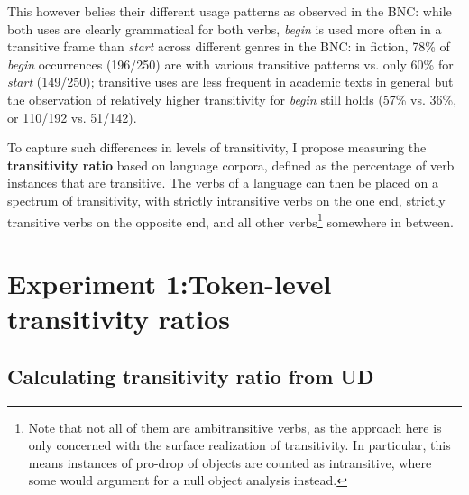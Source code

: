 \begin{exe}
\ex\label{example-begin_start}
  \begin{xlist}
  \end{xlist}
\end{exe}

This however belies their different usage patterns as observed in the BNC: while both uses are clearly grammatical for both verbs, \textit{begin} is used more often in a transitive frame than \textit{start} across different genres in the BNC: in fiction, 78\% of \textit{begin} occurrences (196/250) are with various transitive patterns vs. only 60\% for \textit{start} (149/250); transitive uses are less frequent in academic texts in general but the observation of relatively higher transitivity for \textit{begin} still holds (57\% vs. 36\%, or 110/192 vs. 51/142).

To capture such differences in levels of transitivity, I propose measuring the \textbf{transitivity ratio} based on language corpora, defined as the percentage of verb instances that are transitive. The verbs of a language can then be placed on a spectrum of transitivity, with strictly intransitive verbs on the one end, strictly transitive verbs on the opposite end, and all other verbs\footnote{Note that not all of them are ambitransitive verbs, as the approach here is only concerned with the surface realization of transitivity. In particular, this means instances of pro-drop of objects are counted as intransitive, where some would argument for a null object analysis instead.} somewhere in between.


\section{Experiment 1:Token-level transitivity ratios}\label{sec:exp1}
\subsection{Calculating transitivity ratio from UD}

